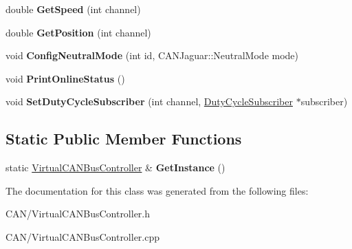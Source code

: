 \begin{DoxyCompactItemize}
\item 
\hypertarget{class_virtual_c_a_n_bus_controller_ac6e3ae8b7cf5fa569e111836d5692e6d}{
double {\bfseries \-Get\-Speed} (int channel)}
\label{class_virtual_c_a_n_bus_controller_ac6e3ae8b7cf5fa569e111836d5692e6d}

\item 
\hypertarget{class_virtual_c_a_n_bus_controller_a42b4b8c108797e770c9df049af64c548}{
double {\bfseries \-Get\-Position} (int channel)}
\label{class_virtual_c_a_n_bus_controller_a42b4b8c108797e770c9df049af64c548}

\item 
\hypertarget{class_virtual_c_a_n_bus_controller_ad0eace8725e0e1311baf140307420b97}{
void {\bfseries \-Config\-Neutral\-Mode} (int id, \-C\-A\-N\-Jaguar\-::\-Neutral\-Mode mode)}
\label{class_virtual_c_a_n_bus_controller_ad0eace8725e0e1311baf140307420b97}

\item 
\hypertarget{class_virtual_c_a_n_bus_controller_a90d5c5af50eb65cc2633f27fe7b77c27}{
void {\bfseries \-Print\-Online\-Status} ()}
\label{class_virtual_c_a_n_bus_controller_a90d5c5af50eb65cc2633f27fe7b77c27}

\item 
\hypertarget{class_virtual_c_a_n_bus_controller_a6cfe1d34ff73e838aeb747dd9628910b}{
void {\bfseries \-Set\-Duty\-Cycle\-Subscriber} (int channel, \hyperlink{class_duty_cycle_subscriber}{\-Duty\-Cycle\-Subscriber} $\ast$subscriber)}
\label{class_virtual_c_a_n_bus_controller_a6cfe1d34ff73e838aeb747dd9628910b}

\end{DoxyCompactItemize}
\subsection*{\-Static \-Public \-Member \-Functions}
\begin{DoxyCompactItemize}
\item 
\hypertarget{class_virtual_c_a_n_bus_controller_aee0942408e5fd0b693589966cbb504a5}{
static \hyperlink{class_virtual_c_a_n_bus_controller}{\-Virtual\-C\-A\-N\-Bus\-Controller} \& {\bfseries \-Get\-Instance} ()}
\label{class_virtual_c_a_n_bus_controller_aee0942408e5fd0b693589966cbb504a5}

\end{DoxyCompactItemize}


\-The documentation for this class was generated from the following files\-:\begin{DoxyCompactItemize}
\item 
\-C\-A\-N/\-Virtual\-C\-A\-N\-Bus\-Controller.\-h\item 
\-C\-A\-N/\-Virtual\-C\-A\-N\-Bus\-Controller.\-cpp\end{DoxyCompactItemize}
